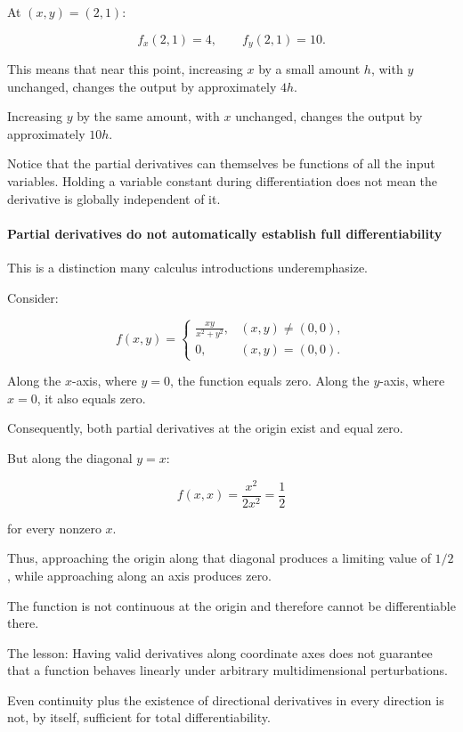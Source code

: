 At \((x,y)=(2,1)\):

\[
f_x(2,1)=4, \qquad f_y(2,1)=10.
\]

This means that near this point, increasing \(x\) by a small amount \(h\), with \(y\) unchanged, changes the output by approximately \(4h\).

Increasing \(y\) by the same amount, with \(x\) unchanged, changes the output by approximately \(10h\).

Notice that the partial derivatives can themselves be functions of all the input variables. Holding a variable constant during differentiation does not mean the derivative is globally independent of it.

\paragraph{Partial derivatives do not automatically establish full differentiability}\label{02-foundations-ii-ch021-partial-derivatives-do-not-automatically-establish-full-differentiability}

This is a distinction many calculus introductions underemphasize.

Consider:

\[
f(x,y)= \begin{cases} \displaystyle\frac{xy}{x^2+y^2}, &(x,y)\ne(0,0),\\ 0,&(x,y)=(0,0). \end{cases}
\]

Along the \(x\)-axis, where \(y=0\), the function equals zero. Along the \(y\)-axis, where \(x=0\), it also equals zero.

Consequently, both partial derivatives at the origin exist and equal zero.

But along the diagonal \(y=x\):

\[
f(x,x)=\frac{x^2}{2x^2}=\frac12
\]

for every nonzero \(x\).

Thus, approaching the origin along that diagonal produces a limiting value of \(1/2\), while approaching along an axis produces zero.

The function is not continuous at the origin and therefore cannot be differentiable there.

The lesson: Having valid derivatives along coordinate axes does not guarantee that a function behaves linearly under arbitrary multidimensional perturbations.

Even continuity plus the existence of directional derivatives in every direction is not, by itself, sufficient for total differentiability.

